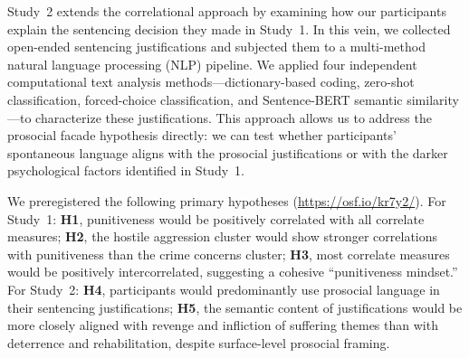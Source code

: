 Study~2 extends the correlational approach by examining how our participants explain the sentencing decision they made in Study~1. In this vein, we collected open-ended sentencing justifications and subjected them to a multi-method natural language processing (NLP) pipeline. We applied four independent computational text analysis methods---dictionary-based coding, zero-shot classification, forced-choice classification, and Sentence-BERT semantic similarity---to characterize these justifications. This approach allows us to address the prosocial facade hypothesis directly: we can test whether participants' spontaneous language aligns with the prosocial justifications or with the darker psychological factors identified in Study~1.

We preregistered the following primary hypotheses (\url{https://osf.io/kr7y2/}). For Study~1: \textbf{H1}, punitiveness would be positively correlated with all correlate measures; \textbf{H2}, the hostile aggression cluster would show stronger correlations with punitiveness than the crime concerns cluster; \textbf{H3}, most correlate measures would be positively intercorrelated, suggesting a cohesive ``punitiveness mindset.'' For Study~2: \textbf{H4}, participants would predominantly use prosocial language in their sentencing justifications; \textbf{H5}, the semantic content of justifications would be more closely aligned with revenge and infliction of suffering themes than with deterrence and rehabilitation, despite surface-level prosocial framing.